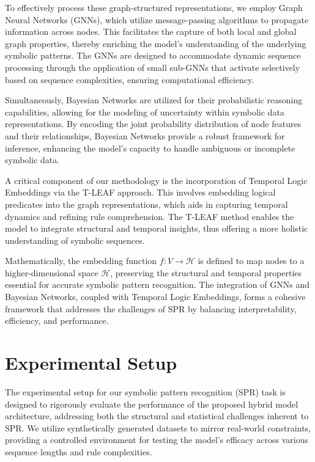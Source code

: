 \documentclass{article}
\begin{document}
To effectively process these graph-structured representations, we employ Graph Neural Networks (GNNs), which utilize message-passing algorithms to propagate information across nodes. This facilitates the capture of both local and global graph properties, thereby enriching the model's understanding of the underlying symbolic patterns. The GNNs are designed to accommodate dynamic sequence processing through the application of small sub-GNNs that activate selectively based on sequence complexities, ensuring computational efficiency.

Simultaneously, Bayesian Networks are utilized for their probabilistic reasoning capabilities, allowing for the modeling of uncertainty within symbolic data representations. By encoding the joint probability distribution of node features and their relationships, Bayesian Networks provide a robust framework for inference, enhancing the model's capacity to handle ambiguous or incomplete symbolic data.

A critical component of our methodology is the incorporation of Temporal Logic Embeddings via the T-LEAF approach. This involves embedding logical predicates into the graph representations, which aids in capturing temporal dynamics and refining rule comprehension. The T-LEAF method enables the model to integrate structural and temporal insights, thus offering a more holistic understanding of symbolic sequences.

Mathematically, the embedding function \( f: V \to \mathcal{H} \) is defined to map nodes to a higher-dimensional space \( \mathcal{H} \), preserving the structural and temporal properties essential for accurate symbolic pattern recognition. The integration of GNNs and Bayesian Networks, coupled with Temporal Logic Embeddings, forms a cohesive framework that addresses the challenges of SPR by balancing interpretability, efficiency, and performance.

\section{Experimental Setup}
The experimental setup for our symbolic pattern recognition (SPR) task is designed to rigorously evaluate the performance of the proposed hybrid model architecture, addressing both the structural and statistical challenges inherent to SPR. We utilize synthetically generated datasets to mirror real-world constraints, providing a controlled environment for testing the model's efficacy across various sequence lengths and rule complexities.
\end{document}

